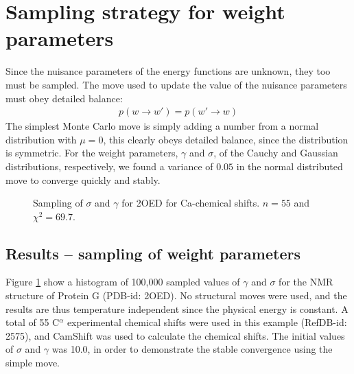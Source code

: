 \section{Sampling strategy for weight parameters}
Since the nuisance parameters of the energy functions are unknown, they too must be sampled.
The move used to update the value of the nuisance parameters must obey detailed balance:
\begin{eqnarray}
    p\left(w \rightarrow w'\right) = p\left(w' \rightarrow w\right)
\end{eqnarray}
The simplest Monte Carlo move is simply adding a number from a normal distribution with $\mu = 0$, this clearly obeys detailed balance, since the distribution is symmetric.
For the weight parameters, $\gamma$ and $\sigma$, of the Cauchy and Gaussian distributions, respectively, we found a variance of $0.05$ in the normal distributed move to converge quickly and stably.

\begin{figure}%
    \centering
    \qquad
    \caption{Sampling of $\sigma$ and $\gamma$ for 2OED for Ca-chemical shifts. $n = 55$ and $\chi^2 = 69.7$.}
    \label{fig:example}%
\end{figure}


\subsection{Results -- sampling of weight parameters}
Figure \ref{fig:example} show a histogram of 100,000 sampled values of $\gamma$ and $\sigma$ for the NMR structure of Protein G (PDB-id: 2OED). 
No structural moves were used, and the results are thus temperature independent since the physical energy is constant.
A total of 55 C$^\alpha$ experimental chemical shifts were used in this example (RefDB-id: 2575), and CamShift was used to calculate the chemical shifts. 
The initial values of $\sigma$ and $\gamma$ was 10.0, in order to demonstrate the stable convergence using the simple move.

